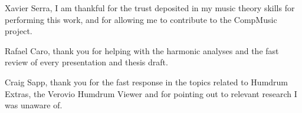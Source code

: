 
\begin{acknowledgement}

Xavier Serra, I am thankful for the trust deposited in my music theory skills for performing this work, and for allowing me to contribute to the CompMusic project.

Rafael Caro, thank you for helping with the harmonic analyses and the fast review of every presentation and thesis draft.

Craig Sapp, thank you for the fast response in the topics related to Humdrum Extras, the Verovio Humdrum Viewer and for pointing out to relevant research I was unaware of. 

\newpage
\end{acknowledgement}
